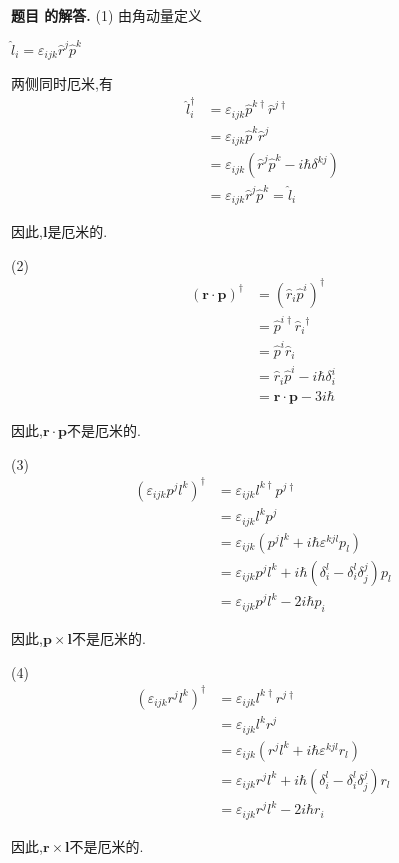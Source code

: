 \documentclass[12pt, a4paper, oneside]{ctexart}
\newcounter{problemname}
\newenvironment{solution}
  {\par\noindent\textbf{题目 \theproblemname 的解答. }}
  {\par}
\begin{document}
\begin{solution}
  (1)
  由角动量定义

  \centerline{$\hat{l}_i = \varepsilon_{ijk} \hat{r}^j \hat{p}^k$}

  两侧同时厄米,有
  \begin{align*}
    \hat{l}_i^\dagger &= \varepsilon_{ijk} \hat{p}^{k\dagger}\hat{r}^{j\dagger}\\
    &= \varepsilon_{ijk} \hat{p}^k \hat{r}^j\\
    &= \varepsilon_{ijk} (\hat{r}^j \hat{p}^k - i\hbar \delta^{kj})\\
    &= \varepsilon_{ijk} \hat{r}^j \hat{p}^k = \hat{l}_i
  \end{align*}
  
  因此,$\boldsymbol{l}$是厄米的.

  (2)
  \begin{align*}
    (\boldsymbol{r} \cdot \boldsymbol{p})^\dagger &= (\hat{r}_i \hat{p}^i)^\dagger\\
    &= \hat{p}^{i\dagger} {\hat{r}_i}^\dagger \\
    &= \hat{p}^{i} {\hat{r}_i}\\
    &= \hat{r}_i \hat{p}^i -i\hbar \delta^i_i \\
    &= \boldsymbol{r} \cdot \boldsymbol{p} -3i\hbar
  \end{align*}

  因此,$\boldsymbol{r} \cdot \boldsymbol{p}$不是厄米的.

  (3)
  \begin{align*}
    (\varepsilon_{ijk} p^j l^k)^\dagger &= \varepsilon_{ijk} l^{k\dagger} p^{j\dagger}\\
    &= \varepsilon_{ijk} l^{k} p^{j} \\
    &= \varepsilon_{ijk} (p^j l^k + i\hbar\varepsilon^{kjl} p_l)\\
    &= \varepsilon_{ijk} p^j l^k +i\hbar (\delta_i^l - \delta_i^l \delta_j^j) p_l\\
    &= \varepsilon_{ijk} p^j l^k - 2i\hbar p_i
  \end{align*}

  因此,$\boldsymbol{p} \times \boldsymbol{l}$不是厄米的.

  (4)
  \begin{align*}
    (\varepsilon_{ijk} r^j l^k)^\dagger &= \varepsilon_{ijk} l^{k\dagger} r^{j\dagger}\\
    &= \varepsilon_{ijk} l^{k} r^{j} \\
    &= \varepsilon_{ijk} (r^j l^k + i\hbar\varepsilon^{kjl} r_l)\\
    &= \varepsilon_{ijk} r^j l^k +i\hbar (\delta_i^l - \delta_i^l \delta_j^j) r_l\\
    &= \varepsilon_{ijk} r^j l^k - 2i\hbar r_i
  \end{align*}

  因此,$\boldsymbol{r} \times \boldsymbol{l}$不是厄米的.

\end{solution}
\end{document}
